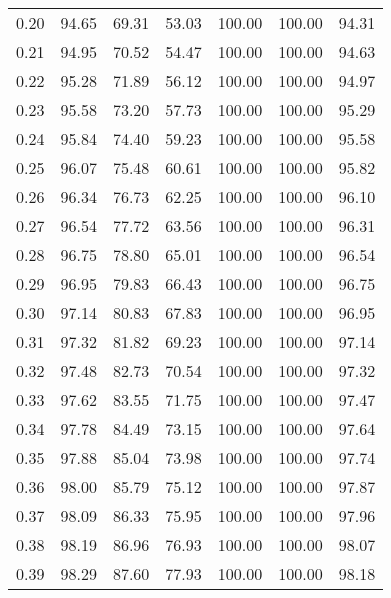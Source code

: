 \begin{tabular}{|c|c|c|c|c|c|c|}
      0.20 &     94.65 &     69.31 &      53.03 &  100.00 &     100.00 &         94.31 \\
      0.21 &     94.95 &     70.52 &      54.47 &  100.00 &     100.00 &         94.63 \\
      0.22 &     95.28 &     71.89 &      56.12 &  100.00 &     100.00 &         94.97 \\
      0.23 &     95.58 &     73.20 &      57.73 &  100.00 &     100.00 &         95.29 \\
      0.24 &     95.84 &     74.40 &      59.23 &  100.00 &     100.00 &         95.58 \\
      0.25 &     96.07 &     75.48 &      60.61 &  100.00 &     100.00 &         95.82 \\
      0.26 &     96.34 &     76.73 &      62.25 &  100.00 &     100.00 &         96.10 \\
      0.27 &     96.54 &     77.72 &      63.56 &  100.00 &     100.00 &         96.31 \\
      0.28 &     96.75 &     78.80 &      65.01 &  100.00 &     100.00 &         96.54 \\
      0.29 &     96.95 &     79.83 &      66.43 &  100.00 &     100.00 &         96.75 \\
      0.30 &     97.14 &     80.83 &      67.83 &  100.00 &     100.00 &         96.95 \\
      0.31 &     97.32 &     81.82 &      69.23 &  100.00 &     100.00 &         97.14 \\
      0.32 &     97.48 &     82.73 &      70.54 &  100.00 &     100.00 &         97.32 \\
      0.33 &     97.62 &     83.55 &      71.75 &  100.00 &     100.00 &         97.47 \\
      0.34 &     97.78 &     84.49 &      73.15 &  100.00 &     100.00 &         97.64 \\
      0.35 &     97.88 &     85.04 &      73.98 &  100.00 &     100.00 &         97.74 \\
      0.36 &     98.00 &     85.79 &      75.12 &  100.00 &     100.00 &         97.87 \\
      0.37 &     98.09 &     86.33 &      75.95 &  100.00 &     100.00 &         97.96 \\
      0.38 &     98.19 &     86.96 &      76.93 &  100.00 &     100.00 &         98.07 \\
      0.39 &     98.29 &     87.60 &      77.93 &  100.00 &     100.00 &         98.18 \\

\end{tabular}
